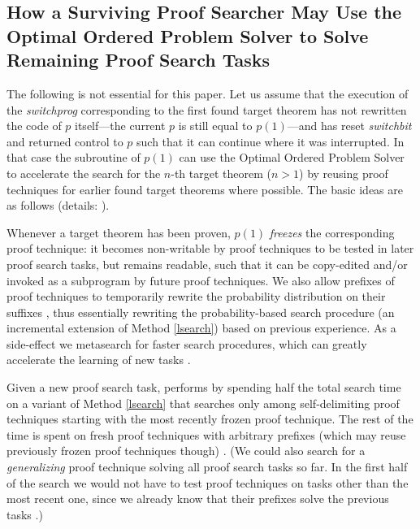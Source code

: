 \subsection{How a Surviving Proof Searcher May
Use the Optimal Ordered Problem Solver to Solve Remaining Proof Search Tasks}
\label{remaining}

The following is not essential for this paper.
Let us assume that the execution of the {\em switchprog}
corresponding to the first found target theorem has not rewritten the code of
$p$ itself---the current $p$ is still equal to $p(1)$---and has
reset {\em switchbit} and returned
control to $p$ such that it can continue where it was interrupted.
In that case the \Biops subroutine of $p(1)$ can use the Optimal
Ordered Problem Solver \Oops
\cite{Schmidhuber:04oops}
to accelerate the search for the
$n$-th target theorem ($n>1$) by reusing proof techniques for earlier found
target theorems where possible.  The basic ideas are as
follows (details: \cite{Schmidhuber:04oops}).

Whenever a target theorem has been proven, $p(1)$ {\em freezes}
the corresponding proof technique: it becomes non-writable
by proof techniques to be tested in later proof search tasks,
but remains readable,
such that it can be copy-edited and/or invoked as a subprogram by future proof
techniques.  We also allow prefixes of proof
techniques to temporarily rewrite the probability distribution
on their suffixes
\cite{Schmidhuber:04oops},
thus essentially rewriting
the probability-based search
procedure (an incremental extension of Method \ref{lsearch})
based on previous experience. As a side-effect we metasearch
for faster search procedures, which can greatly accelerate the learning of
new tasks \cite{Schmidhuber:04oops}.

Given a new proof search task, \Biops performs \Oops
by spending half the total search time on a
variant of
Method \ref{lsearch}
that searches only among self-delimiting
\cite{Levin:74,Chaitin:75} proof techniques starting with the most recently
frozen proof technique.  The rest of the
time is spent on fresh proof techniques with arbitrary prefixes
(which may reuse previously frozen proof techniques though)
\cite{Schmidhuber:04oops}.
(We could also search for a {\em generalizing} proof technique
solving all proof search tasks so far. In the first half of the search
we would not have to test proof techniques on tasks other than
the most recent one, since we already know that their prefixes
solve the previous tasks
\cite{Schmidhuber:04oops}.)

